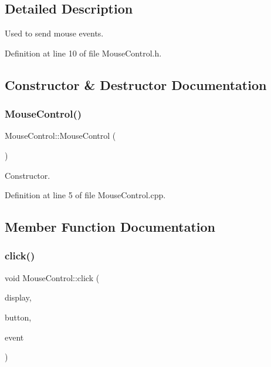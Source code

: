 \subsection{Detailed Description}
Used to send mouse events. 

Definition at line 10 of file Mouse\+Control.\+h.



\subsection{Constructor \& Destructor Documentation}
\mbox{\label{class_ubuntu_controller_1_1_mouse_control_a16de792a08f8e9bbcb656ba0e434507c}} 
\subsubsection{\texorpdfstring{Mouse\+Control()}{MouseControl()}}
{\footnotesize\ttfamily Mouse\+Control\+::\+Mouse\+Control (\begin{DoxyParamCaption}\item[{void}]{ }\end{DoxyParamCaption})}

Constructor. 

Definition at line 5 of file Mouse\+Control.\+cpp.



\subsection{Member Function Documentation}
\mbox{\label{class_ubuntu_controller_1_1_mouse_control_aef7670a46bf01b4a10767a9942dbdb79}} 
\subsubsection{\texorpdfstring{click()}{click()}}
{\footnotesize\ttfamily void Mouse\+Control\+::click (\begin{DoxyParamCaption}\item[{Display $\ast$}]{display,  }\item[{int}]{button,  }\item[{X\+Event}]{event }\end{DoxyParamCaption})}

